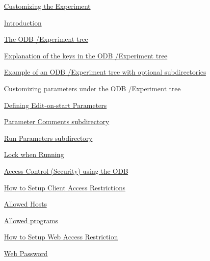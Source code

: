 \begin{TabularC}{2}
\begin{TabularC}{2}
\begin{DoxyItemize}
\item \hyperlink{RC_customize_ODB}{Customizing the Experiment} 
\begin{DoxyItemize}
\item \hyperlink{RC_customize_ODB_RC_customize_intro}{Introduction} 
\item \hyperlink{RC_customize_ODB_RC_ODB_Experiment_Tree}{The ODB /Experiment tree} 
\begin{DoxyItemize}
\item \hyperlink{RC_customize_ODB_RC_Experiment_tree_keys}{Explanation of the keys in the ODB /Experiment tree} 
\item \hyperlink{RC_customize_ODB_RC_Experiment_Tree_Example}{Example of an ODB /Experiment tree with optional subdirectories} 
\item \hyperlink{RC_customize_ODB_RC_customize_experiment_tree}{Customizing parameters under the ODB /Experiment tree} 
\begin{DoxyItemize}
\item \hyperlink{RC_customize_ODB_RC_Edit_On_Start}{Defining Edit-\/on-\/start Parameters} 
\begin{DoxyItemize}
\item \hyperlink{RC_customize_ODB_RC_parameter_comments}{Parameter Comments subdirectory} 
\item \hyperlink{RC_customize_ODB_RC_Run_Parameters}{Run Parameters subdirectory} 
\end{DoxyItemize}
\item \hyperlink{RC_customize_ODB_RC_Lock_when_Running}{Lock when Running} 
\item \hyperlink{RC_customize_ODB_RC_Access_Control}{Access Control (Security) using the ODB} 
\begin{DoxyItemize}
\item \hyperlink{RC_customize_ODB_RC_Setup_Security}{How to Setup Client Access Restrictions} 
\item \hyperlink{RC_customize_ODB_RC_security_allowed_hosts}{Allowed Hosts} 
\item \hyperlink{RC_customize_ODB_RC_security_allowed_programs}{Allowed programs} 
\end{DoxyItemize}
\item \hyperlink{RC_customize_ODB_RC_Setup_Web_Security}{How to Setup Web Access Restriction} 
\begin{DoxyItemize}
\item \hyperlink{RC_customize_ODB_RC_security_web_pw}{Web Password} 
\end{DoxyItemize}

\end{DoxyItemize}
\end{DoxyItemize}
\end{DoxyItemize}
\end{DoxyItemize}
\end{TabularC}
\end{TabularC}
